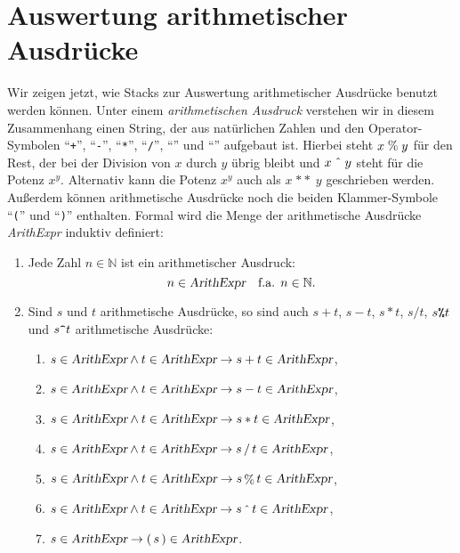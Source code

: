 \section{Auswertung arithmetischer Ausdr\"ucke}
Wir zeigen jetzt, wie Stacks zur Auswertung arithmetischer Ausdr\"ucke benutzt werden
k\"onnen.  Unter einem \emph{arithmetischen Ausdruck} verstehen wir in diesem Zusammenhang
einen String, der aus nat\"urlichen Zahlen und den Operator-Symbolen ``\texttt{+}'',
``\texttt{-}'', ``\texttt{*}'', ``\texttt{/}'', ``\texttt{}'' und
``\texttt{}'' aufgebaut ist.  Hierbei steht $x \;\mathtt{\symbol{37}}\; y$ f\"ur
den Rest, der bei der Division von $x$ durch $y$ \"ubrig bleibt und
$x\;\mathtt{\symbol{94}}\;y$ steht f\"ur die Potenz $x^y$.  Alternativ kann die Potenz $x^y$
auch als $x \;\mathtt{**}\; y$ geschrieben werden.
Au{\ss}erdem k\"onnen arithmetische
Ausdr\"ucke noch die beiden Klammer-Symbole ``\texttt{(}'' und ``\texttt{)}'' enthalten.  
Formal wird die Menge der arithmetische Ausdr\"ucke \textsl{ArithExpr} induktiv definiert:
\begin{enumerate}
\item Jede Zahl $n \in \mathbb{N}$ ist ein arithmetischer Ausdruck:
      \[ n \in \textsl{ArithExpr} \quad \mbox{f.a. $n \in \mathbb{N}$}. \]
\item Sind $s$ und $t$ arithmetische Ausdr\"ucke, so sind auch $s + t$, $s - t$, $s * t$, 
      $s / t$, $s \texttt{\symbol{37}} t$ und $s \texttt{\symbol{94}} t$
      arithmetische Ausdr\"ucke:
      \begin{enumerate}
      \item $s \in \textsl{ArithExpr} \wedge t \in \textsl{ArithExpr} \rightarrow s + t \in \textsl{ArithExpr}$,
      \item $s \in \textsl{ArithExpr} \wedge t \in \textsl{ArithExpr} \rightarrow s - t \in \textsl{ArithExpr}$,
      \item $s \in \textsl{ArithExpr} \wedge t \in \textsl{ArithExpr} \rightarrow s * t \in \textsl{ArithExpr}$,
      \item $s \in \textsl{ArithExpr} \wedge t \in \textsl{ArithExpr} \rightarrow s \mathop{/} t \in \textsl{ArithExpr}$,
      \item $s \in \textsl{ArithExpr} \wedge t \in \textsl{ArithExpr} \rightarrow s
        \mathop{\symbol{37}} t \in \textsl{ArithExpr}$,
      \item $s \in \textsl{ArithExpr} \wedge t \in \textsl{ArithExpr} \rightarrow s \mathop{\symbol{94}} t \in \textsl{ArithExpr}$,
      \item $s \in \textsl{ArithExpr} \rightarrow (\, s\,) \in \textsl{ArithExpr}$.
      \end{enumerate}
\end{enumerate}
